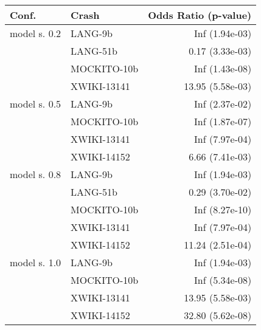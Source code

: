 \begin{tabular}{ l | l | r}
\hline 
\textbf{Conf.} & \textbf{Crash} & \textbf{Odds Ratio (p-value)} \\ 
\hline 
model s. 0.2 & LANG-9b & Inf (1.94e-03)\\ 
 & LANG-51b & 0.17 (3.33e-03)\\ 
 & MOCKITO-10b & Inf (1.43e-08)\\ 
 & XWIKI-13141 & 13.95 (5.58e-03)\\ 
\hline 
model s. 0.5 & LANG-9b & Inf (2.37e-02)\\ 
 & MOCKITO-10b & Inf (1.87e-07)\\ 
 & XWIKI-13141 & Inf (7.97e-04)\\ 
 & XWIKI-14152 & 6.66 (7.41e-03)\\ 
\hline 
model s. 0.8 & LANG-9b & Inf (1.94e-03)\\ 
 & LANG-51b & 0.29 (3.70e-02)\\ 
 & MOCKITO-10b & Inf (8.27e-10)\\ 
 & XWIKI-13141 & Inf (7.97e-04)\\ 
 & XWIKI-14152 & 11.24 (2.51e-04)\\ 
\hline 
model s. 1.0 & LANG-9b & Inf (1.94e-03)\\ 
 & MOCKITO-10b & Inf (5.34e-08)\\ 
 & XWIKI-13141 & 13.95 (5.58e-03)\\ 
 & XWIKI-14152 & 32.80 (5.62e-08)\\ 
\hline 
\end{tabular}